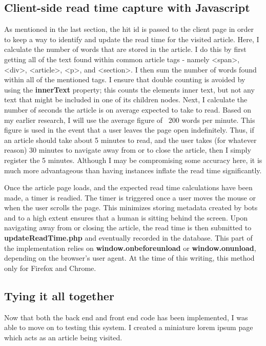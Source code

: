 \documentclass[12pt]{article}
\begin{document}
\subsection{Client-side read time capture with Javascript}
As mentioned in the last section, the hit id is passed to the client page in order to keep a way to identify and update the read time for the visited article. Here, I calculate the number of words that are stored in the article. I do this by first getting all of the text found within common article tags - namely <span>, <div>, <article>, <p>, and <section>. I then sum the number of words found within all of the mentioned tags. I ensure that double counting is avoided by using the \textbf{innerText} property; this counts the elements inner text, but not any text that might be included in one of its children nodes. Next, I calculate the number of seconds the article is on average expected to take to read. Based on my earlier research, I will use the average figure of ~200 words per minute. This figure is used in the event that a user leaves the page open indefinitely. Thus, if an article should take about 5 minutes to read, and the user takes (for whatever reason) 30 minutes to navigate away from or to close the article, then I simply register the 5 minutes. Although I may be compromising some accuracy here, it is much more advantageous than having instances inflate the read time significantly.

Once the article page loads, and the expected read time calculations have been made, a timer is readied. The timer is triggered once a user moves the mouse or when the user scrolls the page. This minimizes storing metadata created by bots and to a high extent ensures that a human is sitting behind the screen. Upon navigating away from or closing the article, the read time is then submitted to \textbf{updateReadTime.php} and eventually recorded in the database. This part of the implementation relies on \textbf{window.onbeforeunload} or \textbf{window.onunload}, depending on the browser's user agent. At the time of this writing, this method only for Firefox and Chrome.
 
\vfill

\subsection{Tying it all together}
Now that both the back end and front end code has been implemented, I was able to move on to testing this system. I created a miniature lorem ipsum page which acts as an article being visited. \\
\end{document}

